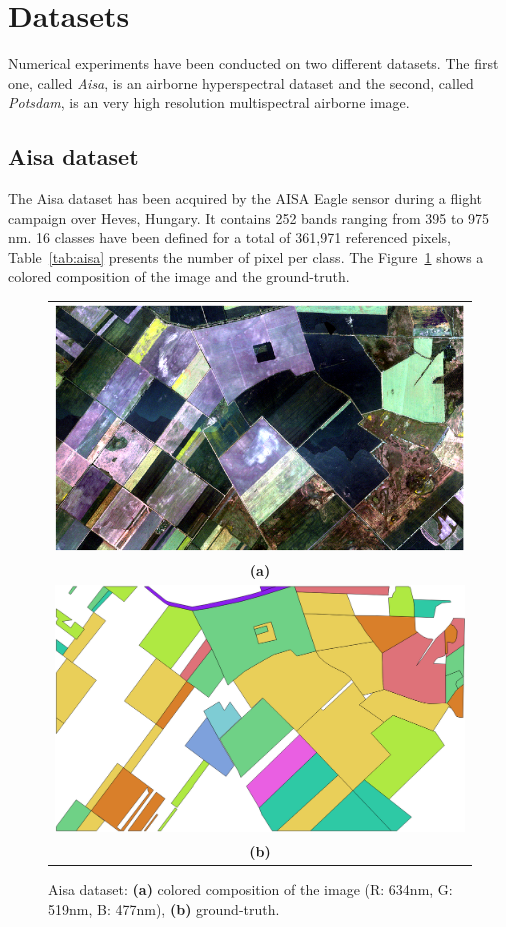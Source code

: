 \documentclass[journal,10pt]{IEEEtran}
\begin{document}
\section{Datasets}
\label{sec:datasets}
Numerical experiments have been  conducted on two different datasets.
The  first  one,  called  \emph{Aisa}, is  an  airborne  hyperspectral
dataset  and  the  second,  called \emph{Potsdam},  is  an  very  high
resolution multispectral airborne image.

    \subsection{Aisa dataset}
    \label{sec:aisa-dataset}
    The Aisa dataset has been acquired by the AISA Eagle sensor during
    a  flight campaign  over Heves,  Hungary.  It  contains 252  bands
    ranging from  395 to 975  nm. 16 classes  have been defined  for a
    total of 361,971  referenced pixels, Table~\ref{tab:aisa} presents
    the number of pixel per  class.  The Figure~\ref{fig:aisa} shows a
    colored composition of the image and the ground-truth.

    \begin{figure}[!t]
        \centering
        \begin{tabular}{c}
            \includegraphics[width=0.6\columnwidth]{Fig/aisa.png} \\
            {\bfseries{(a)}} \\
            \includegraphics[width=0.6\columnwidth]{Fig/aisa_gt.png} \\
            {\bfseries{(b)}} \\
        \end{tabular}
        \caption{Aisa dataset: {\bfseries{(a)}} colored composition of the image (R: 634nm, G: 519nm, B: 477nm), {\bfseries{(b)}} ground-truth.\label{fig:aisa}}
    \end{figure}
\end{document}
